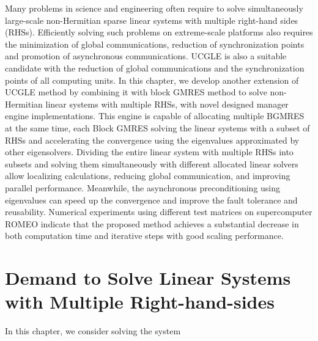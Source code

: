 \begin{displayquote}
	\textsf{Many problems in science and engineering often require to solve simultaneously large-scale non-Hermitian sparse linear systems with multiple right-hand sides (RHSs). Efficiently solving such problems on extreme-scale platforms also requires the minimization of global communications, reduction of synchronization points and promotion of asynchronous communications. UCGLE is also a suitable candidate with the reduction of global communications and the synchronization points of all computing units. In this chapter, we develop another extension of UCGLE method by combining it with block GMRES method to solve non-Hermitian linear systems with multiple RHSs, with novel designed manager engine implementations. This engine is capable of allocating multiple BGMRES at the same time, each Block GMRES solving the linear systems with a subset of RHSs and accelerating the convergence using the eigenvalues approximated by other eigensolvers. Dividing the entire linear system with multiple RHSs into subsets and solving them simultaneously with different allocated linear solvers allow localizing calculations, reducing global communication, and improving parallel performance. Meanwhile, the asynchronous preconditioning using eigenvalues can speed up the convergence and improve the fault tolerance and reusability. Numerical experiments using different test matrices on supercomputer ROMEO indicate that the proposed method achieves a substantial decrease in both computation time and iterative steps with good scaling performance.}
\end{displayquote}

\vspace{0.6in}

\section{Demand to Solve Linear Systems with Multiple Right-hand-sides}

In this chapter, we consider solving the system

